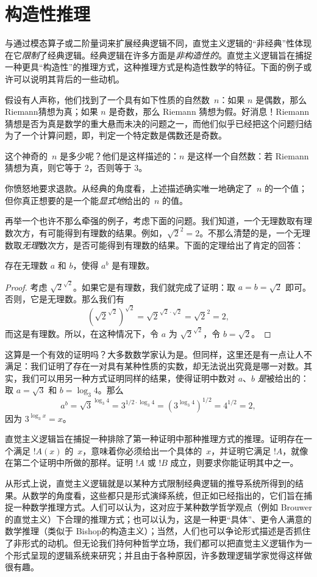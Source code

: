 \documentclass[../../../include/open-logic-chapter]{subfiles}
\begin{document}

\section{构造性推理}

与通过模态算子或二阶量词来扩展经典逻辑不同，直觉主义逻辑的“非经典”性体现在它\emph{限制}了经典逻辑。经典逻辑在许多方面是\emph{非构造性的}。直觉主义逻辑旨在捕捉一种更具“构造性”的推理方式，这种推理方式是构造性数学的特征。下面的例子或许可以说明其背后的一些动机。

假设有人声称，他们找到了一个具有如下性质的自然数~$n$：如果 $n$ 是偶数，那么 Riemann猜想为真；如果 $n$ 是奇数，那么 Riemann 猜想为假。好消息！{}Riemann 猜想是否为真是数学的重大悬而未决的问题之一，而他们似乎已经把这个问题归结为了一个计算问题，即，判定一个特定数是偶数还是奇数。

这个神奇的~$n$ 是多少呢？他们是这样描述的：$n$ 是这样一个自然数：若 Riemann 猜想为真，则它等于 $2$，否则等于 $3$。

你愤怒地要求退款。从经典的角度看，上述描述确实唯一地确定了~$n$ 的一个值；但你真正想要的是一个能\emph{显式地}给出的~$n$ 的值。

再举一个也许不那么牵强的例子，考虑下面的问题。我们知道，一个无理数取有理数次方，有可能得到有理数的结果。例如，$\sqrt{2}^2 = 2$。不那么清楚的是，一个无理数取\emph{无理}数次方，是否可能得到有理数的结果。下面的定理给出了肯定的回答：

\begin{thm}
存在无理数 $a$ 和 $b$，使得 $a^b$ 是有理数。
\end{thm}

\begin{proof}
考虑 $\sqrt{2}^{\sqrt{2}}$。如果它是有理数，我们就完成了证明：取 $a = b = \sqrt{2}$ 即可。否则，它是无理数。那么我们有
\[
(\sqrt{2}^{\sqrt{2}})^{\sqrt{2}} = \sqrt{2}^{\sqrt{2} \cdot
  \sqrt{2}} = \sqrt{2}^2 = 2,
\]
而这是有理数。所以，在这种情况下，令 $a$ 为 $\sqrt{2}^{\sqrt{2}}$，令 $b = \sqrt 2$。
\end{proof}

这算是一个有效的证明吗？大多数数学家认为是。但同样，这里还是有一点让人不满足：我们证明了存在一对具有某种性质的实数，却无法说出究竟是哪一对数。其实，我们可以用另一种方式证明同样的结果，使得证明中数对 $a$、$b$ \emph{是}被给出的：取 $a = \sqrt{3}$ 和 $b = \log_3 4$。那么
\[
a^b = \sqrt{3}^{\log_3 4} = 3^{1/2 \cdot \log_3 4} = (3^{\log_3
  4})^{1/2} = 4^{1/2}= 2,
\]
因为 $3^{\log_3 x} = x$。

直觉主义逻辑旨在捕捉一种排除了第一种证明中那种推理方式的推理。证明存在一个满足 $!A(x)$ 的~$x$，意味着你必须给出一个具体的~$x$，并证明它满足 $!A$，就像在第二个证明中所做的那样。证明 $!A$ 或 $!B$ 成立，则要求你能证明其中之一。

从形式上说，直觉主义逻辑就是以某种方式限制经典逻辑的推导系统所得到的结果。从数学的角度看，这些都只是形式演绎系统，但正如已经指出的，它们旨在捕捉一种数学推理方式。人们可以认为，这对应于某种数学哲学观点（例如 Brouwer的直觉主义）下合理的推理方式；也可以认为，这是一种更“具体”、更令人满意的数学推理（类似于 Bishop的构造主义）；当然，人们也可以争论形式描述是否抓住了非形式的动机。但无论我们持何种哲学立场，我们都可以把直觉主义逻辑作为一个形式呈现的逻辑系统来研究；并且由于各种原因，许多数理逻辑学家觉得这样做很有趣。
\end{document}
